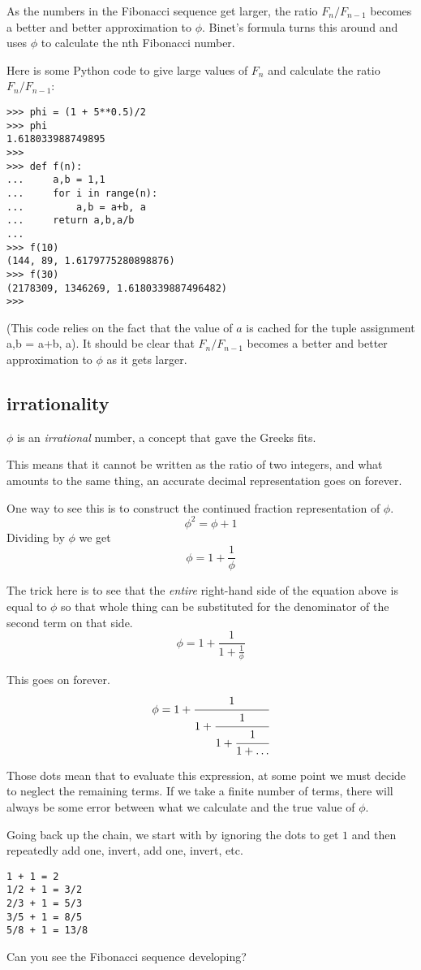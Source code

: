 \documentclass[11pt, oneside]{article}
\begin{document}
As the numbers in the Fibonacci sequence get larger, the ratio $F_{n} / F_{n-1}$ becomes a better and better approximation to $\phi$.  Binet's formula turns this around and uses $\phi$ to calculate the nth Fibonacci number.

Here is some Python code to give large values of $F_n$ and calculate the ratio $F_{n} / F_{n-1}$:
\begin{verbatim}
>>> phi = (1 + 5**0.5)/2
>>> phi
1.618033988749895
>>>
>>> def f(n):
...     a,b = 1,1
...     for i in range(n):
...         a,b = a+b, a
...     return a,b,a/b
... 
>>> f(10)
(144, 89, 1.6179775280898876)
>>> f(30)
(2178309, 1346269, 1.6180339887496482)
>>> 
\end{verbatim}

(This code relies on the fact that the value of $a$ is cached for the tuple assignment a,b = a+b, a). It should be clear that $F_n/F_{n-1}$ becomes a better and better approximation to $\phi$ as it gets larger.

\subsection*{irrationality}

$\phi$ is an \emph{irrational} number, a concept that gave the Greeks fits.

This means that it cannot be written as the ratio of two integers, and what amounts to the same thing, an accurate decimal representation goes on forever.

One way to see this is to construct the continued fraction representation of $\phi$.
\[ \phi^2 = \phi + 1 \]
Dividing by $\phi$ we get
\[ \phi = 1 + \frac{1}{\phi} \]

The trick here is to see that the \emph{entire} right-hand side of the equation above is equal to $\phi$ so that whole thing can be substituted for the denominator of the second term on that side.
\[ \phi = 1 + \frac{1}{1 + \frac{1}{\phi}} \]

This goes on forever.
\[ \phi = 1 + \cfrac{1}{1+\cfrac{1}{1+\cfrac{1}{1 + \dots}}}  \]

Those dots mean that to evaluate this expression, at some point we must decide to neglect the remaining terms.  If we take a finite number of terms, there will always be some error between what we calculate and the true value of $\phi$.   

Going back up the chain, we start with by ignoring the dots to get $1$ and then repeatedly add one, invert, add one, invert, etc.

\begin{verbatim}
1 + 1 = 2
1/2 + 1 = 3/2
2/3 + 1 = 5/3
3/5 + 1 = 8/5
5/8 + 1 = 13/8
\end{verbatim}

Can you see the Fibonacci sequence developing?
\end{document}
